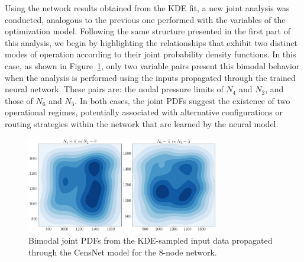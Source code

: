 Using the network results obtained from the KDE fit, a new joint analysis was conducted, analogous to the previous one performed with the variables of the optimization model. Following the same structure presented in the first part of this analysis, we begin by highlighting the relationships that exhibit two distinct modes of operation according to their joint probability density functions. In this case, as shown in Figure~\cref{fig:joint_distributions_input_input_KDE}, only two variable pairs present this bimodal behavior when the analysis is performed using the inputs propagated through the trained neural network. These pairs are: the nodal pressure limits of $N_4$ and $N_2$, and those of $N_6$ and $N_5$. In both cases, the joint PDFs suggest the existence of two operational regimes, potentially associated with alternative configurations or routing strategies within the network that are learned by the neural model. 


\begin{figure}[htbp]
    \begin{center}
        \includegraphics[width=0.75\textwidth]{figures/Chapter_NonLinealCensnet/PDF_inputs_inputs (Sampled).png}
    \end{center}
    \caption{Bimodal joint PDFs from the KDE-sampled input data propagated through the CensNet model for the 8-node network.}
    \label{fig:joint_distributions_input_input_KDE}
\end{figure}
 


